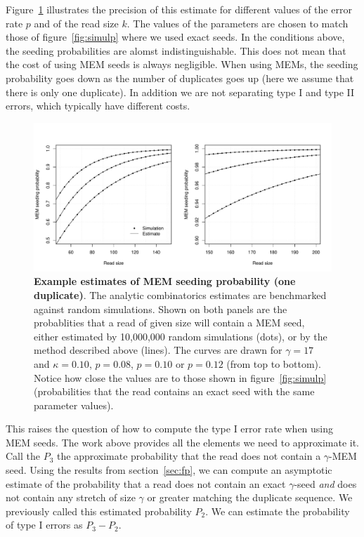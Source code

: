 \documentclass{article}
\begin{document}
Figure~\ref{fig:simulp_mem} illustrates the precision of this estimate for
different values of the error rate $p$ and of the read size $k$. The
values of the parameters are chosen to match those of
figure~\ref{fig:simulp} where we used exact seeds. In the conditions
above, the seeding probabilities are alomst indistinguishable. This does
not mean that the cost of using MEM seeds is always negligible. When using
MEMs, the seeding probability goes down as the number of duplicates goes
up (here we assume that there is only one duplicate). In addition we are
not separating type I and type II errors, which typically have different
costs.

\begin{figure}[h]
\centering
\includegraphics[scale=0.445]{simulp_mem.pdf}
\caption{\textbf{Example estimates of MEM seeding probability (one
duplicate)}. The analytic combinatorics estimates are benchmarked against
random simulations. Shown on both panels are the probablities that a read
of given size will contain a MEM seed, either estimated by 10,000,000
random simulations (dots), or by the method described above (lines). The
curves are drawn for $\gamma=17$ and $\kappa=0.10$, $p=0.08$, $p=0.10$ or
$p=0.12$ (from top to bottom). Notice how close the values are to those
shown in figure~\ref{fig:simulp} (probabilities that the read contains an
exact seed with the same parameter values).}
\label{fig:simulp_mem}
\end{figure}


This raises the question of how to compute the type I error rate when
using MEM seeds. The work above provides all the elements we need to
approximate it. Call the $P_3$ the approximate probability that the read
does not contain a $\gamma$-MEM seed. Using the results from
section~\ref{sec:fp}, we can compute an asymptotic estimate of the
probability that a read does not contain an exact $\gamma$-seed \emph{and}
does not contain any stretch of size $\gamma$ or greater matching the
duplicate sequence. We previously called this estimated probability $P_2$.
We can estimate the probability of type I errors as $P_3-P_2$.
\end{document}

